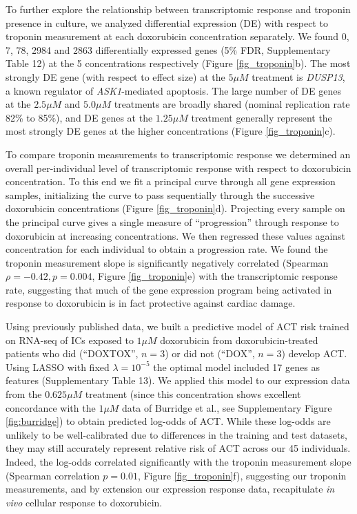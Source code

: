 \documentclass{article}
\begin{document}
To further explore the relationship between transcriptomic response and troponin presence in culture, we analyzed differential expression (DE) with respect to troponin measurement at each doxorubicin concentration separately. We found 0, 7, 78, 2984 and 2863 differentially expressed genes (5\% FDR, Supplementary Table 12) at the 5 concentrations respectively (Figure \ref{fig_troponin}b). The most strongly DE gene (with respect to effect size) at the $5 \mu M$ treatment is \emph{DUSP13}, a known regulator of \emph{ASK1}-mediated apoptosis\cite{park2010positive}. The large number of DE genes at the $2.5 \mu M$ and $5.0 \mu M$ treatments are broadly shared (nominal replication rate 82\% to 85\%), and DE genes at the $1.25 \mu M$ treatment generally represent the most strongly DE genes at the higher concentrations (Figure \ref{fig_troponin}c). 

To compare troponin measurements to transcriptomic response we determined an overall per-individual level of transcriptomic response with respect to doxorubicin concentration. To this end we fit a principal curve\citep{hastie1989principal} through all gene expression samples, initializing the curve to pass sequentially through the successive doxorubicin concentrations (Figure \ref{fig_troponin}d). Projecting every sample on the principal curve gives a single measure of ``progression'' through response to doxorubicin at increasing concentrations. We then regressed these values against concentration for each individual to obtain a progression rate. We found the troponin measurement slope is significantly negatively correlated (Spearman $\rho=-0.42, p=0.004$, Figure \ref{fig_troponin}e) with the transcriptomic response rate, suggesting that much of the gene expression program being activated in response to doxorubicin is in fact protective against cardiac damage. 

Using previously published data\cite{Burridge2016}, we built a predictive model of ACT risk trained on RNA-seq of ICs exposed to $1 \mu M$ doxorubicin from doxorubicin-treated patients who did (``DOXTOX'', $n=3$) or did not (``DOX'', $n=3$) develop ACT. Using LASSO with fixed $\lambda=10^{-5}$ the optimal model included 17 genes as features (Supplementary Table 13). We applied this model to our expression data from the $0.625 \mu M$ treatment (since this concentration shows excellent concordance with the $1 \mu M$ data of Burridge et al., see Supplementary Figure \ref{fig:burridge}) to obtain predicted log-odds of ACT. While these log-odds are unlikely to be well-calibrated due to differences in the training and test datasets, they may still accurately represent relative risk of ACT across our 45 individuals. Indeed, the log-odds correlated significantly with the troponin measurement slope (Spearman correlation $p=0.01$, Figure \ref{fig_troponin}f), suggesting our troponin measurements, and by extension our expression response data, recapitulate \emph{in vivo} cellular response to doxorubicin. 
\end{document}
